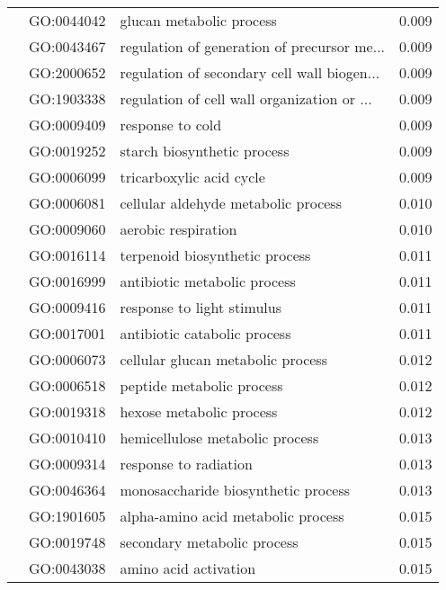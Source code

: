 \begin{longtable}{lllr}
   & GO:0044042 &                     glucan metabolic process &         0.009 \\
   & GO:0043467 &  regulation of generation of precursor me... &         0.009 \\
   & GO:2000652 &  regulation of secondary cell wall biogen... &         0.009 \\
   & GO:1903338 &  regulation of cell wall organization or ... &         0.009 \\
   & GO:0009409 &                             response to cold &         0.009 \\
   & GO:0019252 &                  starch biosynthetic process &         0.009 \\
   & GO:0006099 &                     tricarboxylic acid cycle &         0.009 \\
   & GO:0006081 &          cellular aldehyde metabolic process &         0.010 \\
   & GO:0009060 &                          aerobic respiration &         0.010 \\
   & GO:0016114 &               terpenoid biosynthetic process &         0.011 \\
   & GO:0016999 &                 antibiotic metabolic process &         0.011 \\
   & GO:0009416 &                   response to light stimulus &         0.011 \\
   & GO:0017001 &                 antibiotic catabolic process &         0.011 \\
   & GO:0006073 &            cellular glucan metabolic process &         0.012 \\
   & GO:0006518 &                    peptide metabolic process &         0.012 \\
   & GO:0019318 &                     hexose metabolic process &         0.012 \\
   & GO:0010410 &              hemicellulose metabolic process &         0.013 \\
   & GO:0009314 &                        response to radiation &         0.013 \\
   & GO:0046364 &          monosaccharide biosynthetic process &         0.013 \\
   & GO:1901605 &           alpha-amino acid metabolic process &         0.015 \\
   & GO:0019748 &                  secondary metabolic process &         0.015 \\
   & GO:0043038 &                        amino acid activation &         0.015 \\

\end{longtable}
